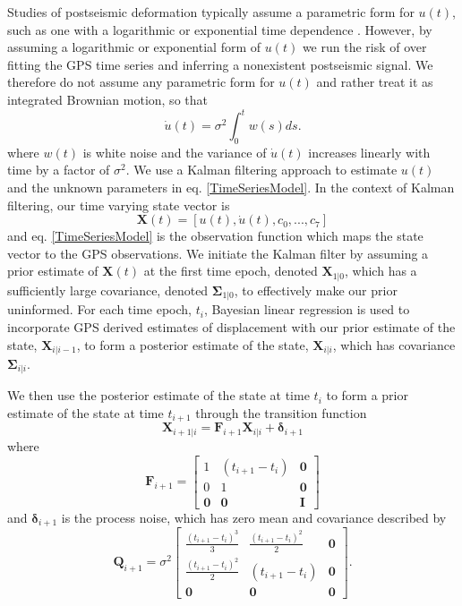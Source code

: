 \documentclass[12pt]{article}
\begin{document}
Studies of postseismic deformation typically assume a parametric form for $u(t)$, such as one with a logarithmic or exponential time dependence \citep[e.g.][]{Savage2005a}.  However, by assuming a logarithmic or exponential form of $u(t)$ we run the risk of over fitting the GPS time series and inferring a nonexistent postseismic signal. We therefore do not assume any parametric form for $u(t)$ and rather treat it as integrated Brownian motion, so that 
\begin{equation}
    \dot{u}(t) = \sigma^2\int_0^t w(s) ds.
\end{equation}    
where $w(t)$ is white noise and the variance of $\dot{u}(t)$ increases linearly with time by a factor of $\sigma^2$. We use a Kalman filtering approach to estimate $u(t)$ and the unknown parameters in eq. \ref{TimeSeriesModel}.  In the context of Kalman filtering, our time varying state vector is
\begin{equation}
    \mathbf{X}(t) = [u(t),\dot u(t), c_0, ..., c_7]
\end{equation}
and eq. \ref{TimeSeriesModel} is the observation function which maps the state vector to the GPS observations. We initiate the Kalman filter by assuming a prior estimate of $\mathbf{X}(t)$ at the first time epoch, denoted $\mathbf{X}_{1|0}$, which has a sufficiently large covariance, denoted $\mathbf{\Sigma}_{1|0}$, to effectively make our prior uninformed.  For each time epoch, $t_i$, Bayesian linear regression is used to incorporate GPS derived estimates of displacement with our prior estimate of the state, $\mathbf{X}_{i|i-1}$, to form a posterior estimate of the state, $\mathbf{X}_{i|i}$, which has covariance $\mathbf{\Sigma}_{i|i}$.  

We then use the posterior estimate of the state at time $t_i$ to form a prior estimate of the state at time $t_{i+1}$ through the transition function
\begin{equation}\label{predict}
  \mathbf{X}_{i+1|i} = \mathbf{F}_{i+1}\mathbf{X}_{i|i} + \mathbf{\delta}_{i+1} 
\end{equation}
where 
\begin{equation}
  \mathbf{F}_{i+1} = 
  \left[
  \begin{array}{ccc}
    1           & (t_{i+1} - t_i) & \mathbf{0}\\
    0           & 1              & \mathbf{0}\\
    \mathbf{0}  & \mathbf{0}     & \mathbf{I}
  \end{array}
  \right]
\end{equation}
and $\mathbf{\delta}_{i+1}$ is the process noise, which has zero mean and covariance described by
\begin{equation}
  \mathbf{Q}_{i+1} = 
  \sigma^2 \left[
  \begin{array}{ccc}
  \frac{(t_{i+1} - t_i)^3}{3} & \frac{(t_{i+1} - t_{i})^2}{2} & \mathbf{0}\\
  \frac{(t_{i+1} - t_i)^2}{2} & (t_{i+1} - t_{i}) & \mathbf{0}\\ 
  \mathbf{0} & \mathbf{0} & \mathbf{0}
  \end{array}
  \right].
\end{equation}
\end{document}
